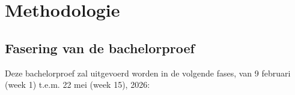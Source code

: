 
\section{Methodologie}%
\label{sec:voorstel_methodologie}







\subsection{Fasering van de bachelorproef}%
\label{subsec:voorstel_fasering_bap}

Deze bachelorproef zal uitgevoerd worden in de volgende fases, van 9 februari (week 1) t.e.m. 22 mei (week 15), 2026:

